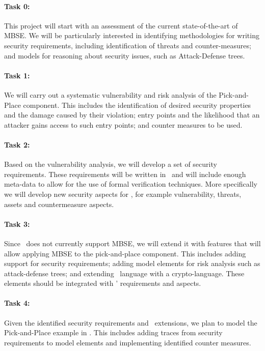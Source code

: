 \paragraph{Task 0:} This project will start with an assessment of the current
state-of-the-art of MBSE. We will be particularly interested in identifying methodologies for writing security requirements, including identification of threats and counter-measures; and models for reasoning about security issues, such as Attack-Defense trees.

\paragraph{Task 1:} We will carry out a systematic vulnerability and risk
analysis of the Pick-and-Place component. This includes the identification of
desired security properties and the damage caused by their violation; entry
points and the likelihood that an attacker gains access to such entry points;
and counter measures to be used.

\paragraph{Task 2:} Based on the vulnerability analysis, we will develop a set
of security requirements. These requirements will be written in \autofocus\ and
will include enough meta-data to allow for the use of formal verification
techniques. More specifically we will develop new security aspects for
\autofocus, for example vulnerability, threats, assets and countermeasure
aspects.

\paragraph{Task 3:} Since \autofocus\ does not currently support MBSE, we will
extend it with features that will allow applying MBSE to the pick-and-place
component.
This includes adding support for security requirements; adding model elements
for risk analysis such as attack-defense trees; and extending \autofocus\
language with a crypto-language. These elements should be integrated with \autofocus'
requirements and aspects.

\paragraph{Task 4:} Given the identified security requirements and \autofocus\
extensions, we plan to model the Pick-and-Place example in \autofocus. This
includes adding traces from security requirements to model elements and
implementing identified counter measures.

